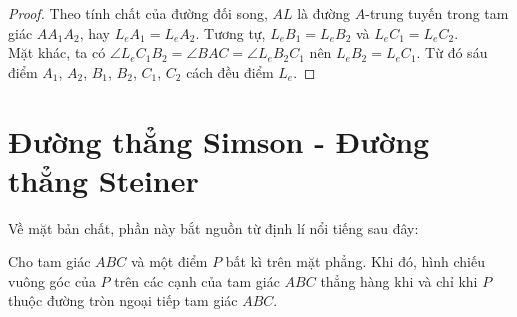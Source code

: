         \begin{proof}
            Theo tính chất của đường đối song, \(AL\) là đường \(A\)-trung tuyến trong tam giác \(AA_1A_2\), hay \(L_eA_1 = L_eA_2\). Tương tự, \(L_eB_1 = L_eB_2\) và \(L_eC_1 = L_eC_2\).\\
            Mặt khác, ta có \(\angle L_eC_1B_2 = \angle BAC = \angle L_eB_2C_1\) nên \(L_eB_2 = L_eC_1\). Từ đó sáu điểm \(A_1\), \(A_2\), \(B_1\), \(B_2\), \(C_1\), \(C_2\) cách đều điểm \(L_e\).
        \end{proof}

    \section{Đường thẳng Simson - Đường thẳng Steiner}

        Về mặt bản chất, phần này bắt nguồn từ định lí nổi tiếng sau đây:

        \begin{theorem}
            Cho tam giác \(ABC\) và một điểm \(P\) bất kì trên mặt phẳng. Khi đó, hình chiếu vuông góc của \(P\) trên các cạnh của tam giác \(ABC\) thẳng hàng khi và chỉ khi \(P\) thuộc đường tròn ngoại tiếp tam giác \(ABC\).
        \end{theorem}

